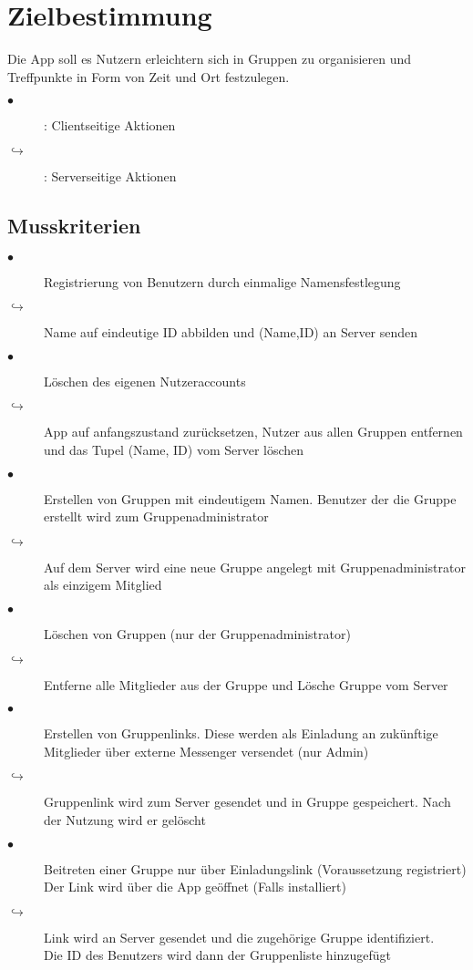 \documentclass{scrartcl}
\begin{document}
\section{Zielbestimmung}
Die App soll es Nutzern erleichtern sich in Gruppen zu organisieren
und Treffpunkte in Form von Zeit und Ort festzulegen.
\begin{description}
\item[$\bullet$]: Clientseitige Aktionen
\item[$\hookrightarrow$]: Serverseitige Aktionen
\end{description}
\subsection{Musskriterien}
\begin{description}
\item[$\bullet$] Registrierung von Benutzern durch einmalige Namensfestlegung
\item[$\hookrightarrow$] Name auf eindeutige ID abbilden und (Name,ID) an Server senden
\item[$\bullet$] Löschen des eigenen Nutzeraccounts
\item[$\hookrightarrow$] App auf anfangszustand zurücksetzen, Nutzer aus allen Gruppen entfernen und das Tupel (Name, ID) vom Server löschen
\item[$\bullet$] Erstellen von Gruppen mit eindeutigem Namen. Benutzer der die Gruppe erstellt wird zum Gruppenadministrator
\item[$\hookrightarrow$] Auf dem Server wird eine neue Gruppe angelegt mit Gruppenadministrator als einzigem Mitglied
\item[$\bullet$] Löschen von Gruppen (nur der Gruppenadministrator)
\item[$\hookrightarrow$] Entferne alle Mitglieder aus der Gruppe und Lösche Gruppe vom Server
\item[$\bullet$] Erstellen von Gruppenlinks. Diese werden als Einladung an zukünftige Mitglieder über externe Messenger versendet (nur Admin)
\item[$\hookrightarrow$] Gruppenlink wird zum Server gesendet und in Gruppe gespeichert. Nach der Nutzung wird er gelöscht
\item[$\bullet$] Beitreten einer Gruppe nur über Einladungslink (Voraussetzung registriert)
     Der Link wird über die App geöffnet (Falls installiert)
\item[$\hookrightarrow$] Link wird an Server gesendet und die zugehörige Gruppe identifiziert.\\ Die ID des Benutzers wird dann der Gruppenliste hinzugefügt

\end{description}
\end{document}
